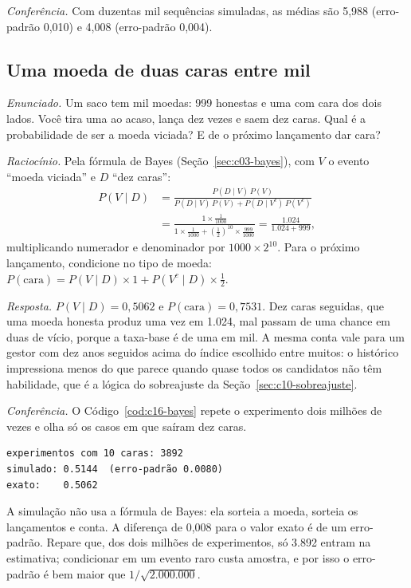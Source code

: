 \emph{Conferência.} Com duzentas mil sequências simuladas, as médias são 5,988 (erro-padrão 0,010) e 4,008 (erro-padrão 0,004).

\subsection{Uma moeda de duas caras entre mil}

\emph{Enunciado.} Um saco tem mil moedas: 999 honestas e uma com cara dos dois lados. Você tira uma ao acaso, lança dez vezes e saem dez caras. Qual é a probabilidade de ser a moeda viciada? E de o próximo lançamento dar cara?

\emph{Raciocínio.} Pela fórmula de Bayes (Seção~\ref{sec:c03-bayes}), com $V$ o evento ``moeda viciada'' e $D$ ``dez caras'':
\begin{align*}
  P(V \mid D) &= \frac{P(D \mid V)\, P(V)}{P(D \mid V)\, P(V) + P(D \mid V^c)\, P(V^c)} \\
  &= \frac{1 \times \frac{1}{1000}}{1 \times \frac{1}{1000} + \left(\frac12\right)^{10} \times \frac{999}{1000}}
  = \frac{1.024}{1.024 + 999} ,
\end{align*}
multiplicando numerador e denominador por $1000 \times 2^{10}$.
Para o próximo lançamento, condicione no tipo de moeda: $P(\text{cara}) = P(V \mid D) \times 1 + P(V^c \mid D) \times \frac{1}{2}$.

\emph{Resposta.} $P(V \mid D) = 0,5062$ e $P(\text{cara}) = 0,7531$. Dez caras seguidas, que uma moeda honesta produz uma vez em 1.024, mal passam de uma chance em duas de vício, porque a taxa-base é de uma em mil. A mesma conta vale para um gestor com dez anos seguidos acima do índice escolhido entre muitos: o histórico impressiona menos do que parece quando quase todos os candidatos não têm habilidade, que é a lógica do sobreajuste da Seção~\ref{sec:c10-sobreajuste}.

\emph{Conferência.} O Código~\ref{cod:c16-bayes} repete o experimento dois milhões de vezes e olha só os casos em que saíram dez caras.


\begin{lstlisting}[style=saida]
experimentos com 10 caras: 3892
simulado: 0.5144  (erro-padrão 0.0080)
exato:    0.5062
\end{lstlisting}

A simulação não usa a fórmula de Bayes: ela sorteia a moeda, sorteia os lançamentos e conta. A diferença de 0,008 para o valor exato é de um erro-padrão. Repare que, dos dois milhões de experimentos, só 3.892 entram na estimativa; condicionar em um evento raro custa amostra, e por isso o erro-padrão é bem maior que $1/\sqrt{2.000.000}$.

